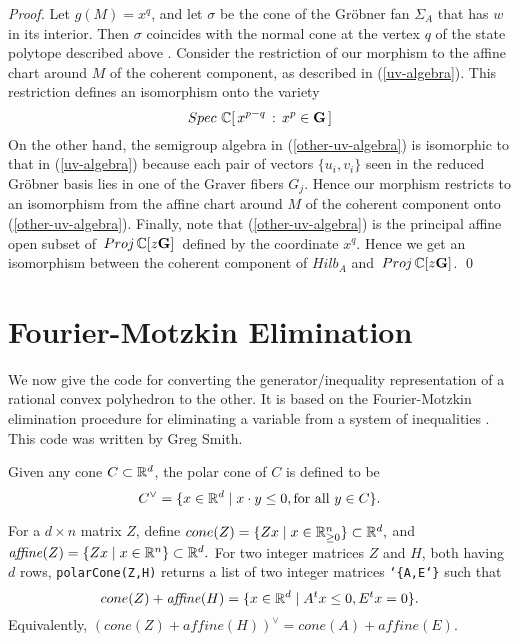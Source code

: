 \begin{proof}
Let $g(M) = x^q$, and let  $\sigma$  be the cone of the
Gr\"obner fan  $\Sigma_A$ that has $w$ in its interior. 
Then  $\sigma$ coincides with the normal cone at the vertex $q$ of 
the state  polytope described above  \cite[\S 3]{HS:St2}.
Consider the restriction of our morphism to the affine chart around $M$
of the coherent component,  as described in (\ref{uv-algebra}).
This restriction defines an isomorphism onto the variety
\begin{equation}
\label{other-uv-algebra}
Spec \,\,  \mathbb{C}[\, x^{p-q} \, : \,x^p \in {\mathbf G} \, ]
\end{equation}
On the other hand, the semigroup algebra in (\ref{other-uv-algebra})
is isomorphic to that in  (\ref{uv-algebra}) because
each pair of vectors $\{u_i, v_i\}$ seen in the 
reduced Gr\"obner basis lies in one of the Graver fibers $G_j$.  
Hence our morphism restricts to an isomorphism from the
affine chart around $M$ of the coherent component onto (\ref{other-uv-algebra}).
Finally, note that (\ref{other-uv-algebra}) is the principal affine
open subset of $\,Proj \,\mathbb{C}[z {\mathbf G}]\,$ defined by the
coordinate $x^q$. Hence we get an isomorphism between the
coherent component of $Hilb_A$ and $\,Proj \,\mathbb{C}[z {\mathbf G}]$.
\qed
\end{proof}

\appendix

\section{Fourier-Motzkin Elimination}\label{FMe}

We now give the \Mtwo code for converting the generator/inequality
representation of a rational convex polyhedron to the other. It is
based on the Fourier-Motzkin elimination procedure for eliminating a
variable from a system of inequalities \cite {HS:Zie}. This code was
written by Greg Smith.

Given any cone $C \subset \mathbb{R}^d$, the polar cone of $C$ is defined to be
$$C^{\vee} = \{ x \in \mathbb{R}^d \mid x \cdot y \leq 0, \mbox{for all\ } y
\in C\}.$$

\noindent For a $d \times n$ matrix $Z$, define
$cone(Z) = \{ Z x \mid x \in \mathbb{R}_{\geq 0}^n \} \subset \mathbb{R}^d,$ and 
$\mathit{affine}(Z) = \{ Z x \mid x \in \mathbb{R}^n \} \subset \mathbb{R}^d.$
For two integer matrices $Z$ and $H$, both having  $d$
rows, {\tt polarCone(Z,H)} returns a list of two integer matrices
{\tt\char`\{A,E\char`\}} such that $$cone(Z) + \mathit{affine}(H) = \{ x \in \mathbb{R}^d \mid A^t
x \leq 0, E^t x = 0\}.$$ 
Equivalently, $(cone(Z) + \mathit{affine}(H))^\vee = cone(A) + \mathit{affine}(E).$


